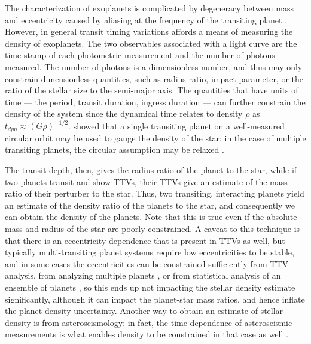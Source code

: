 \documentclass[graybox,natbib,nosecnum]{svmult}
\begin{document}
The characterization of exoplanets is complicated by degeneracy between mass and eccentricity
caused by aliasing at the frequency of the transiting planet \citep{2012ApJ...761..122L,2015ApJ...802..116D}.  
However, in general transit timing variations affords a means of measuring the density of exoplanets.
The two observables associated with a light curve are the time stamp of each photometric
measurement and the number of photons measured.  The number of photons is a dimensionless
number, and thus may only constrain dimensionless quantities, such as radius ratio, impact 
parameter, or the ratio of the stellar size to the semi-major axis.  The quantities that 
have units of time --- the period, transit duration, ingress duration ---  can further
constrain the density of the system since the dynamical time relates to density $\rho$ as
$t_{dyn} \approx (G\rho)^{-1/2}$.  \citet{2003ApJ...585.1038S} showed that a single transiting planet
on a well-measured circular orbit may be used to gauge the density of the star;
in the case of multiple transiting planets, the circular assumption may be relaxed
\citep{2014MNRAS.440.2164K}.

The transit depth, then, gives the radius-ratio of the planet to the star, while if two planets
transit and show TTVs, their TTVs give an estimate of the mass ratio of their perturber
to the star.  Thus, two transiting, interacting planets yield an estimate of the density ratio of
the planets to the star, and consequently we can obtain the density of the planets.
Note that this is true even if the absolute mass and radius of the star are poorly
constrained.  A caveat to this technique is that there is an eccentricity dependence that 
is present in TTVs as well,
but typically multi-transiting planet systems require low eccentricities to be stable,
and in some cases the eccentricities can be constrained sufficiently from TTV analysis, from
analyzing multiple planets \citep{2014MNRAS.440.2164K}, or
from statistical analysis of an ensemble of planets \citep{2014ApJ...787...80H}, so this ends up not impacting the stellar density 
estimate significantly, although it can impact the planet-star mass ratios, and
hence inflate the planet density uncertainty.
Another way to obtain an estimate of stellar density is from asteroseismology:
in fact, the time-dependence of asteroseismic measurements is what enables density
to be constrained in that case as well \citep{1986ApJ...306L..37U}.
\end{document}
